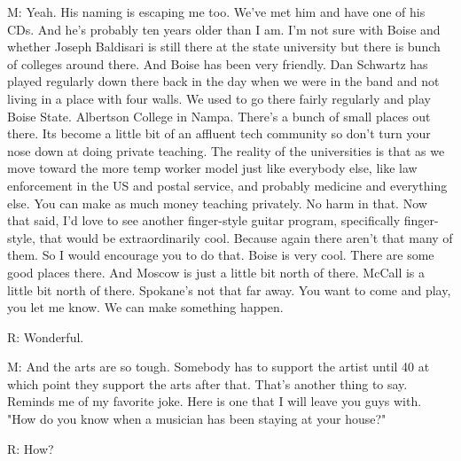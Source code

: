 \documentclass[11pt]{article}
\begin{document}
M: Yeah. His naming is escaping me too. We've met him and have one of
his CDs. And he's probably ten years older than I am. I'm not sure
with Boise and whether Joseph Baldisari is still there at the state
university but there is bunch of colleges around there. And Boise has
been very friendly. Dan Schwartz has played regularly down there back
in the day when we were in the band and not living in a place with
four walls. We used to go there fairly regularly and play Boise
State. Albertson College in Nampa. There's a bunch of small places out
there. Its become a little bit of an affluent tech community so don't
turn your nose down at doing private teaching. The reality of the universities is that as we move toward the more temp worker model just like everybody else, like law enforcement in the US and postal service, and probably medicine and everything else. You can make as much money teaching privately. No harm in that. Now that said, I'd love to see another finger-style guitar program, specifically finger-style, that would be extraordinarily cool. Because again there aren't that many of them. So I would encourage you to do that. Boise is very cool. There are some good places there. And Moscow is just a little bit north of there. McCall is a little bit north of there. Spokane's not that far away. You want to come and play, you let me know. We can make something happen.

R: Wonderful.

M: And the arts are so tough. Somebody has to support the artist until 40 at which point they support the arts after that. That's another thing to say. Reminds me of my favorite joke. Here is one that I will leave you guys with. "How do you know when a musician has been staying at your house?" 

R: How?
\end{document}

